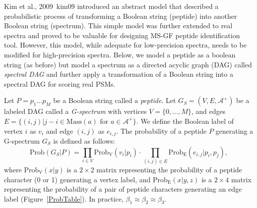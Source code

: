 Kim et al., 2009~\cite{unv}{kim09} introduced an abstract model 
that described a probabilistic process of transforming a Boolean string (peptide) into another Boolean string (spectrum). This simple model was further extended to real spectra and proved to be valuable for designing MS-GF peptide identification tool. 
However, this model, while adequate for low-precision spectra, needs to be modified for high-precision spectra.
Below, we model a peptide as a boolean string (as before) but model a spectrum as a directed acyclic graph (DAG) called 
{\em spectral DAG} and further apply a transformation of a Boolean string into a spectral DAG for scoring real PSMs.

%
%



Let $P=p_1 \ldots p_M$ be a Boolean string called a {\em peptide}.
Let $G_S=(V,E,\mathcal{A}^+)$ be a labeled DAG called a {\em G-spectrum} with vertices $V=\{0, \ldots, M \}$, and edges $E=\{(i,j) | j-i \in \textrm{Mass}(a) \textrm{ for } a \in \mathcal{A}^+ \}$.
We define the Boolean label of vertex $i$ as $v_i$ and edge $(i,j)$ as $e_{i,j}$.
The probability of a peptide $P$ generating a G-spectrum $G_S$ is defined as follows:
$$
\textrm{Prob}(G_S|P)=\prod_{i \in V} \textrm{Prob}_{\textrm{V}}(v_i | p_i) \cdot \prod_{(i,j) \in E} \textrm{Prob}_{\textrm{E}}(e_{i,j} | p_i, p_j),
$$
where $\textrm{Prob}_{\textrm{V}}(x|y)$ is a $2 \times 2$ matrix representing the probability of a peptide character (0 or 1) generating a vertex label,
and $\textrm{Prob}_{\textrm{E}}(x|y,z)$ is a $2 \times 4$ matrix representing the probability of a pair of peptide characters generating an edge label (Figure~\ref{ProbTable}).
In practice, $\beta_1 \approx \beta_2 \approx \beta_3$.

